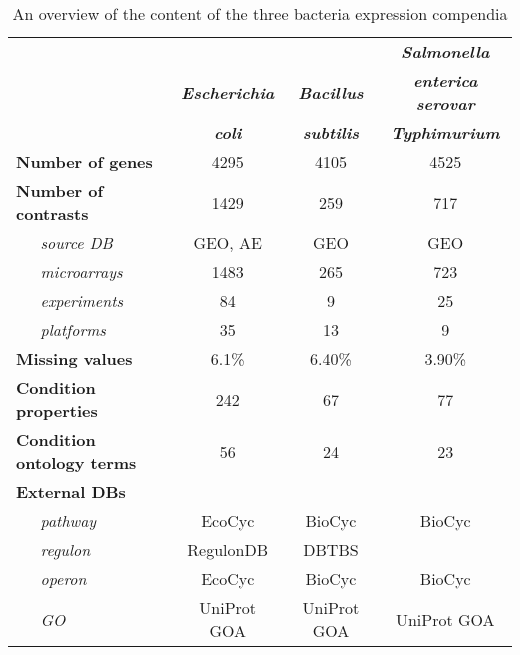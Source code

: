 \begin{table}
	\caption{An overview of the content of the three bacteria expression 
	compendia}
	\label{tab:colTB-overview}
	\begin{small}
	\begin{tabular}{@{}l c c c@{}}
	\toprule
	& & & {\bf\it\small Salmonella} \\
	& {\bf\it\small Escherichia} & {\bf\it\small Bacillus} & {\bf\it\small enterica serovar} \\
	& {\bf\it\small coli} & {\bf\it\small subtilis} & {\bf\it\small  Typhimurium} \\
	\midrule
	{\bf Number of genes} 		& 4295 & 4105 & 4525 \\
	{\bf Number of contrasts} 	& 1429 & 259 & 717 \\
	{\it ~~~source DB} 			& GEO, AE & GEO & GEO \\
	{\it ~~~microarrays} 		& 1483 & 265 & 723 \\
	{\it ~~~experiments}	 	& 84 & 9 & 25 \\
	{\it ~~~platforms} 			& 35 & 13 & 9 \\
	{\bf Missing values} 		& 6.1\% & 6.40\% & 3.90\% \\
	{\bf Condition properties} 	& 242 & 67 & 77 \\
	{\bf Condition ontology terms} & 56 & 24 & 23 \\
	\multicolumn{4}{l}{\bf External DBs} \\
	{\it ~~~pathway} 			& EcoCyc & BioCyc & BioCyc \\
	{\it ~~~regulon} 			& RegulonDB & DBTBS & \\
	{\it ~~~operon} 			& EcoCyc & BioCyc & BioCyc \\
	{\it ~~~GO} 				& UniProt GOA & UniProt GOA & UniProt GOA \\
	\bottomrule
	\end{tabular}
	\end{small}
\end{table}



